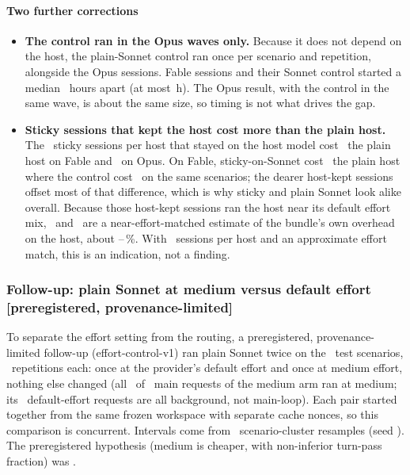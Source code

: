 \paragraph{Two further corrections}
\begin{itemize}
  \item \textbf{The control ran in the Opus waves only.} Because it does not depend on the host, the plain-Sonnet
    control ran once per scenario and repetition, alongside the Opus sessions. Fable sessions and their Sonnet
    control started a median \RvSonnetWaveMedianH\ hours apart (at most \RvSonnetWaveMaxH\,h). The Opus result,
    with the control in the same wave, is about the same size, so timing is not what drives the gap.
  \item \textbf{Sticky sessions that kept the host cost more than the plain host.} The \RvStickyHostNFable\ sticky
    sessions per host that stayed on the host model cost \RvStickyHostFable\X\ the plain host on Fable and
    \RvStickyHostOpus\X\ on Opus. On Fable, sticky-on-Sonnet cost \RvEffVsAnchorFable\X\ the plain host where the
    control cost \RvCtlVsAnchorFable\X\ on the same scenarios; the dearer host-kept sessions offset most of that
    difference, which is why sticky and plain Sonnet look alike overall. Because those host-kept sessions ran the
    host near its default effort mix, \RvStickyHostFable\X\ and \RvStickyHostOpus\X\ are a near-effort-matched estimate
    of the bundle's own overhead on the host, about \RgOverheadFable--\RgOverheadOpus\,\%. With \RvStickyHostNFable\
    sessions per host and an approximate effort match, this is an indication, not a finding.
\end{itemize}

\subsubsection{Follow-up: plain Sonnet at medium versus default effort \texorpdfstring{[preregistered, provenance-limited]}{[preregistered, provenance-limited]}}\label{vt:sec:effortfollow}

To separate the effort setting from the routing, a preregistered, provenance-limited follow-up (effort-control-v1) ran plain Sonnet
twice on the \EcScen\ test scenarios, \EcReps\ repetitions each: once at the provider's default effort and once at
medium effort, nothing else changed (all \RgEcMainMedium\ of \RgEcMainTotal\ main requests of the medium arm ran at
medium; its \RgEcNonMainDefault\ default-effort requests are all background, not main-loop). Each pair started together from the same frozen workspace with separate cache
nonces, so this comparison is concurrent. Intervals come from \EcResamples\ scenario-cluster resamples (seed
\EcSeed). The preregistered hypothesis (medium is cheaper, with non-inferior turn-pass fraction) was \EcHE.

